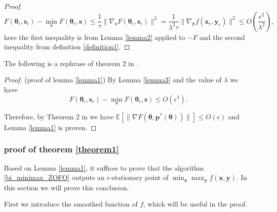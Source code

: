 \begin{proof}
    $$F({ \bm{\theta}}_\epsilon,{ \mathbf{s}}_\epsilon)-\min_{ \mathbf{s}} F({ \bm{\theta}}_\epsilon,{ \mathbf{s}}) \leq \frac{1}{\tau}\|\nabla_{ \mathbf{s}} F({ \bm{\theta}}_\epsilon,{ \mathbf{s}}_\epsilon)\|^2=\frac{1}{\lambda^2\tau}\|\nabla_{ \mathbf{y}} f({ \mathbf{x}}_\epsilon,{ \mathbf{y}}_\epsilon)\|^2\leq O(\frac{\epsilon^2}{\lambda^2}),$$
    here the first inequality is from Lemma \ref{lemma2} applied to $-F$ and the second inequality from definition \ref{definition1}.
\end{proof}

The following is a rephrase of theorem 2 in \cite{LuMei24}.

\begin{proof} (proof of lemma \ref{lemma1})
    By Lemma \ref{lemma3} and the value of $\lambda$ we have $$F({ \bm{\theta}}_\epsilon,{ \mathbf{s}}_\epsilon)-\min_{ \mathbf{s}} F({ \bm{\theta}}_\epsilon,{ \mathbf{s}}) \leq O(\epsilon^4).$$

    Therefore, by Theorem 2 in \cite{LuMei24} we have $\mathbb{E}[\|\nabla F({ \bm{\theta}},{ \mathbf{p}}^*({ \bm{\theta}}))\|]\leq O(\epsilon)$ and Lemma \ref{lemma1} is proven.
\end{proof}

\subsubsection{proof of theorem \ref{theorem1}}

Based on Lemma \ref{lemma1}, it suffices to prove that the algorithm \ref{bi_minimax_ZOFO} outputs an $\epsilon$-stationary point of $\min_{ \mathbf{x}}\max_{ \mathbf{y}} f({ \mathbf{x}},{ \mathbf{y}})$. In this section we will prove this conclusion.

First we introduce the smoothed function of $f$, which will be useful in the proof. 

